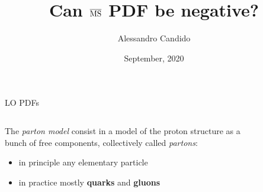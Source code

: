 \documentclass[8pt]{beamer}
\title{Can $\operatorname{\overline{MS}}$ PDF be negative?}
\date{September, 2020}
\author{Alessandro Candido
}
\begin{document}
\maketitle

\begin{frame}{LO PDFs}
    \vspace*{10pt}
    \begin{columns}
        \begin{column}{0.7\textwidth}
            The \textit{parton model} consist in a model of the proton
            structure as a bunch of free components, collectively called
            \textit{partons}:

            \begin{itemize}
                \item in principle any elementary particle
                \item in practice mostly \textbf{quarks} and \textbf{gluons}
            \end{itemize}

        \end{column}
        \begin{column}{0.2\textwidth}
            \begin{figure}
                \centering
                \includegraphics[height=100pt]{pictures/partons}
            \end{figure}
        \end{column}
    \end{columns}



\end{frame}
\end{document}
